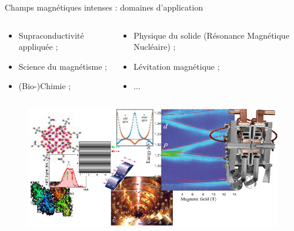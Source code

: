 \begin{frame}{Champs magnétiques intenses : domaines d'application}
  \begin{columns}
    \begin{column}{0.55\textwidth}
      \begin{small}
        \begin{itemize}
        \item Supraconductivité appliquée ;
        \item Science du magnétisme ;
        \item (Bio-)Chimie ;
        \end{itemize}
      \end{small}

    \end{column}

    \begin{column}{0.55\textwidth}
      \begin{small}
        \begin{itemize}
        \item Physique du solide (Résonance Magnétique Nucléaire) ;
        \item Lévitation magnétique ;
        \item ...
        \end{itemize}
      \end{small}

    \end{column}
  \end{columns}

  \begin{figure}[H]
    \includegraphics[scale=0.5]{Figures/cmi/research.png}
  \end{figure}
\end{frame}

